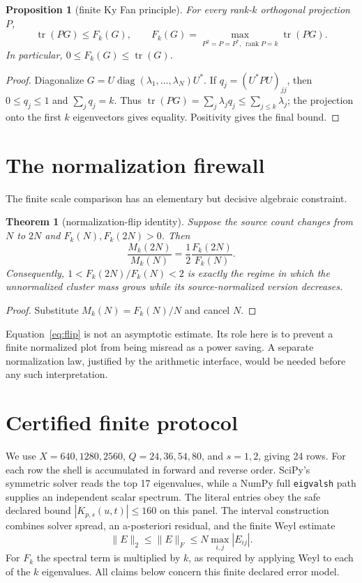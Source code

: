 \documentclass[10pt]{article}
\newtheorem{theorem}{Theorem}
\newtheorem{proposition}{Proposition}
\begin{document}
\begin{proposition}[finite Ky Fan principle]
For every rank-$k$ orthogonal projection $P$,
\[
 \operatorname{tr}(PG)\leq F_k(G),\qquad
 F_k(G)=\max_{P^2=P=P^*,\,\operatorname{rank}P=k}\operatorname{tr}(PG).
\]
In particular, $0\leq F_k(G)\leq\operatorname{tr}(G)$.
\end{proposition}
\begin{proof}
Diagonalize $G=U\operatorname{diag}(\lambda_1,\ldots,\lambda_N)U^*$.
If $q_j=(U^*PU)_{jj}$, then $0\leq q_j\leq1$ and $\sum_jq_j=k$.
Thus $\operatorname{tr}(PG)=\sum_j\lambda_jq_j\leq\sum_{j\leq k}\lambda_j$;
the projection onto the first $k$ eigenvectors gives equality.  Positivity
gives the final bound.\end{proof}

\section{The normalization firewall}

The finite scale comparison has an elementary but decisive algebraic constraint.

\begin{theorem}[normalization-flip identity]
Suppose the source count changes from $N$ to $2N$ and $F_k(N),F_k(2N)>0$.
Then
\begin{equation}
 \frac{M_k(2N)}{M_k(N)}=\frac{1}{2}\frac{F_k(2N)}{F_k(N)}.
 \label{eq:flip}
\end{equation}
Consequently, $1<F_k(2N)/F_k(N)<2$ is exactly the regime in which the
unnormalized cluster mass grows while its source-normalized version decreases.
\end{theorem}
\begin{proof}
Substitute $M_k(N)=F_k(N)/N$ and cancel $N$.\end{proof}

Equation~\eqref{eq:flip} is not an asymptotic estimate.  Its role here is to
prevent a finite normalized plot from being misread as a power saving.  A
separate normalization law, justified by the arithmetic interface, would be
needed before any such interpretation.

\section{Certified finite protocol}

We use $X=640,1280,2560$, $Q=24,36,54,80$, and $s=1,2$, giving 24 rows.
For each row the shell is accumulated in forward and reverse order.  SciPy's
symmetric solver reads the top 17 eigenvalues, while a NumPy full
\texttt{eigvalsh} path supplies an independent scalar spectrum.  The literal
entries obey the safe declared bound $|K_{p,s}(u,t)|\leq160$ on this panel.
The interval construction combines solver spread, an a-posteriori residual,
and the finite Weyl estimate
\[
 \|E\|_2\leq\|E\|_F\leq N\max_{i,j}|E_{ij}|.
\]
For $F_k$ the spectral term is multiplied by $k$, as required by applying
Weyl to each of the $k$ eigenvalues.  All claims below concern this finite
declared error model.
\end{document}
